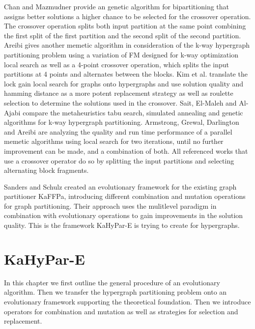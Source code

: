 \documentclass[a4paper,12pt,bibtotoc,titlepage, liststotoc,BCOR7mm,headsepline,pointlessnumbers]{scrbook}
\numberwithin{equation}{section}
\begin{document}
Chan and Mazmudner\cite{chan1995systolic} provide an genetic algorithm for bipartitioning that assigns better solutions a higher chance to be selected for the crossover operation. The crossover operation splits both input partition at the same point combining the first split of the first partition and the second split of the second partition.
Areibi \cite{areibi2000integrated} gives another memetic algorithm in consideration of the k-way hypergraph partitioning problem using a variation of FM designed for k-way optimization \cite{sanchis1989multiple} local search as well as a 4-point crossover operation, which splits the input partitions at 4 points and alternates between the blocks.
\cite{kim2004hybrid} Kim et al. translate the lock gain local search \cite{kim2004lock} for graphs onto hypergraphs and use solution quality and hamming distance as a more potent replacement strategy as well as roulette selection to determine the solutions used in the crossover.
 Sait, El-Maleh and Al-Ajabi \cite{sait2006evolutionary} compare the metaheuristics tabu search, simulated annealing and genetic algorithms for k-way hypergraph partitioning.
Armstrong, Grewal, Darlington and Areibi\cite{armstrong2010investigation} are analyzing the quality and run time performance of a parallel memetic algorithms using local search for two iterations, until no further improvement can be made, and a combination of both. All referenced works that use a crossover operator do so by splitting the input partitions and selecting alternating block fragments.



Sanders and Schulz created an evolutionary framework \cite{sanders2012distributed} for the existing graph partitioner KaFFPa, \cite{holtgrewe2010engineering} introducing different combination and mutation operations for graph partitioning. Their approach uses the mulitlevel paradigm in combination with evolutionary operations to gain improvements in the solution quality. This is the framework KaHyPar-E is trying to create for hypergraphs.
\chapter{KaHyPar-E}
In this chapter we first outline the general procedure of an evolutionary algorithm. Then we transfer the hypergraph partitioning problem onto an evolutionary framework supporting the 
theoretical foundation. Then we introduce operators for combination and mutation as well as strategies for selection and replacement.
\end{document}

